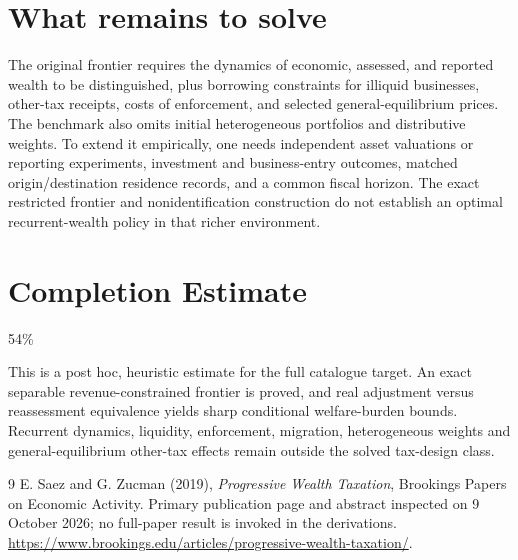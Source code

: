 \documentclass[11pt]{article}
\begin{document}
\section*{What remains to solve}
The original frontier requires the dynamics of economic, assessed, and reported wealth to be distinguished, plus borrowing constraints for illiquid businesses, other-tax receipts, costs of enforcement, and selected general-equilibrium prices. The benchmark also omits initial heterogeneous portfolios and distributive weights. To extend it empirically, one needs independent asset valuations or reporting experiments, investment and business-entry outcomes, matched origin/destination residence records, and a common fiscal horizon. The exact restricted frontier and nonidentification construction do not establish an optimal recurrent-wealth policy in that richer environment.

\section{Completion Estimate}
54\%

This is a post hoc, heuristic estimate for the full catalogue target.
An exact separable revenue-constrained frontier is proved, and real adjustment versus reassessment equivalence yields sharp conditional welfare-burden bounds. Recurrent dynamics, liquidity, enforcement, migration, heterogeneous weights and general-equilibrium other-tax effects remain outside the solved tax-design class.

\begin{thebibliography}{9}
 E. Saez and G. Zucman (2019), \emph{Progressive Wealth Taxation}, Brookings Papers on Economic Activity. Primary publication page and abstract inspected on 9 October 2026; no full-paper result is invoked in the derivations. \url{https://www.brookings.edu/articles/progressive-wealth-taxation/}.
\end{thebibliography}
\end{document}
